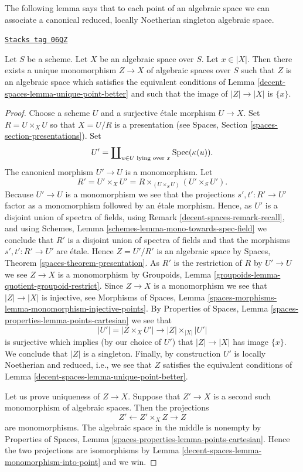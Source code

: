 The following lemma says that to each point of an algebraic space we
can associate a canonical reduced, locally Noetherian singleton
algebraic space.

\begin{lemma}
\label{decent-spaces-lemma-find-singleton-from-point}
\href{https://stacks.math.columbia.edu/tag/06QZ}{\texttt{Stacks tag 06QZ}}

Let $S$ be a scheme. Let $X$ be an algebraic space over $S$.
Let $x \in |X|$. Then there exists a unique monomorphism
$Z \to X$ of algebraic spaces
over $S$ such that $Z$ is an algebraic space which satisfies the equivalent
conditions of
Lemma \ref{decent-spaces-lemma-unique-point-better}
and such that the image of $|Z| \to |X|$ is $\{x\}$.
\end{lemma}

\begin{proof}
Choose a scheme $U$ and a surjective \'etale morphism $U \to X$.
Set $R = U \times_X U$ so that $X = U/R$ is a presentation (see
Spaces, Section \ref{spaces-section-presentations}).
Set
$$
U' = \coprod\nolimits_{u \in U\text{ lying over }x} \operatorname{Spec}(\kappa(u)).
$$
The canonical morphism $U' \to U$ is a monomorphism. Let
$$
R' = U' \times_X U' = R \times_{(U \times_S U)} (U' \times_S U').
$$
Because $U' \to U$ is a monomorphism we see that the projections
$s', t' : R' \to U'$ factor as a monomorphism followed by an
\'etale morphism. Hence, as $U'$ is a disjoint union of spectra
of fields, using
Remark \ref{decent-spaces-remark-recall},
and using
Schemes, Lemma \ref{schemes-lemma-mono-towards-spec-field}
we conclude that $R'$ is a disjoint union of spectra of fields and
that the morphisms $s', t' : R' \to U'$ are \'etale. Hence
$Z = U'/R'$ is an algebraic space by
Spaces, Theorem \ref{spaces-theorem-presentation}.
As $R'$ is the restriction of $R$ by $U' \to U$ we see
$Z \to X$ is a monomorphism by
Groupoids, Lemma \ref{groupoids-lemma-quotient-groupoid-restrict}.
Since $Z \to X$ is a monomorphism we see that $|Z| \to |X|$ is injective, see
Morphisms of Spaces, Lemma
\ref{spaces-morphisms-lemma-monomorphism-injective-points}.
By
Properties of Spaces, Lemma \ref{spaces-properties-lemma-points-cartesian}
we see that
$$
|U'| = |Z \times_X U'| \to |Z| \times_{|X|} |U'|
$$
is surjective which implies (by our choice of $U'$) that
$|Z| \to |X|$ has image $\{x\}$. We conclude that $|Z|$ is a singleton.
Finally, by construction $U'$ is locally Noetherian and reduced, i.e.,
we see that $Z$ satisfies the equivalent conditions of
Lemma \ref{decent-spaces-lemma-unique-point-better}.

\medskip\noindent
Let us prove uniqueness of $Z \to X$. Suppose that
$Z' \to X$ is a second such monomorphism of algebraic spaces.
Then the projections
$$
Z' \longleftarrow Z' \times_X Z \longrightarrow Z
$$
are monomorphisms. The algebraic space in the middle is nonempty by
Properties of Spaces,
Lemma \ref{spaces-properties-lemma-points-cartesian}.
Hence the two projections are isomorphisms by
Lemma \ref{decent-spaces-lemma-monomorphism-into-point}
and we win.
\end{proof}

